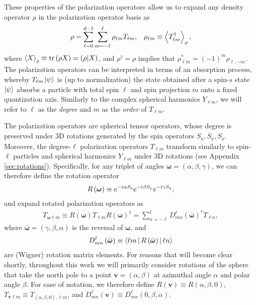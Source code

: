 \documentclass[a4paper,twocolumn,unpublished]{quantumarticle}
\newcommand{\p}[1]{\left(#1\right)} %
\newcommand{\bk}{\Braket} %
\renewcommand{\i}{\mathrm{i}\mkern1mu} %
\newcommand{\x}{\text{x}}
\newcommand{\y}{\text{y}}
\newcommand{\z}{\text{z}}
\def\obk#1{\mathinner{({#1})}}
\begin{document}
These properties of the polarization operators allow us to expand any density operator $\rho$ in the polarization operator basis as
\begin{align}
  \rho = \sum_{\ell=0}^{d-1} \sum_{m=-\ell}^\ell
  \rho_{\ell m} T_{\ell m},
  &&
  \rho_{\ell m} \equiv \bk{T_{\ell m}^\dag}_\rho,
  \label{eq:trans_state}
\end{align}
where $\bk{X}_\rho\equiv\tr\p{\rho X}=\obk{\rho|X}$, and $\rho^\dag=\rho$ implies that $\rho_{\ell m}^*=\p{-1}^m\rho_{\ell,-m}$.
The polarization operators can be interpreted in terms of an absorption process, whereby $T_{\ell m}\ket\psi$ is (up to normalization) the state obtained after a spin-$s$ state $\ket\psi$ absorbs a particle with total spin $\ell$ and spin projection $m$ onto a fixed quantization axis.
Similarly to the complex spherical harmonics $Y_{\ell m}$, we will refer to $\ell$ as the {\it degree} and $m$ as the {\it order} of $T_{\ell m}$.

The polarization operators are spherical tensor operators, whose degree is preserved under 3D rotations generated by the spin operators $S_\x,S_\y,S_\z$.
Moreover, the degree-$\ell$ polarization operators $T_{\ell m}$ transform similarly to spin-$\ell$ particles and spherical harmonics $Y_{\ell m}$ under 3D rotations (see Appendix \ref{sec:rotations}).
Specifically, for any triplet of angles $\bm\omega=\p{\alpha,\beta,\gamma}$, we can therefore define the rotation operator
\begin{align}
  R\p{\bm\omega} \equiv e^{-\i\alpha S_\z} e^{-\i\beta S_\y} e^{-\i\gamma S_\z},
\end{align}
and expand rotated polarization operators as
\begin{align}
  T_{\bm\omega\ell m} \equiv
  R\p{\bm\omega} T_{\ell m} R\p{\bm\omega}^\dag
  = \sum_{n=-\ell}^\ell D_{mn}^\ell\p{\bar{\bm\omega}}^* T_{\ell n},
  \label{eq:trans_rot}
\end{align}
where $\bar{\bm\omega}=\p{\gamma,\beta,\alpha}$ is the reversal of $\bm\omega$, and
\begin{align}
  D_{mn}^\ell\p{\bar{\bm\omega}}
  \equiv \bk{\ell m|R\p{\bar{\bm\omega}}|\ell n}
\end{align}
are (Wigner) rotation matrix elements.
For reasons that will become clear shortly, throughout this work we will primarily consider rotations of the sphere that take the north pole to a point $\bm v=\p{\alpha,\beta}$ at azimuthal angle $\alpha$ and polar angle $\beta$.
For ease of notation, we therefore define $R\p{\bm v} \equiv R\p{\alpha,\beta,0}$, $T_{\bm v\ell m} \equiv T_{\p{\alpha,\beta,0},\ell m}$, and $D^\ell_{mn}\p{\bm v} \equiv D^\ell_{mn}\p{0,\beta,\alpha}$.
\end{document}
